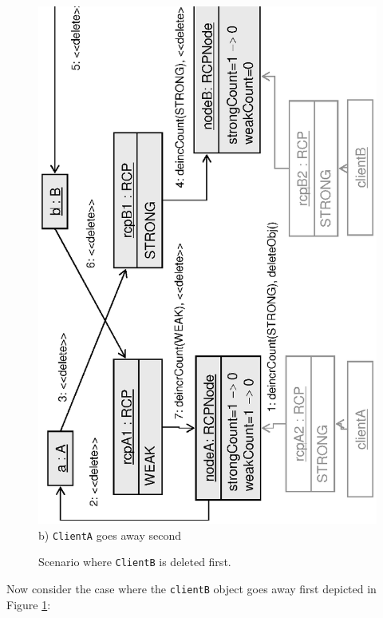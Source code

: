 \documentclass[pdf,ps2pdf,11pt]{SANDreport}
\begin{document}
{\begin{figure}
\begin{center}
\includegraphics*[angle=270,scale=0.65]{CircularRCP_A_B_ClientB_2}
\\[2ex] b) {}\texttt{ClientA} goes away second \\[3ex]
\end{center}
\caption{
\label{fig:CircularRCP_A_B_ClientB}
Scenario where {}\texttt{ClientB} is deleted first.  }
\end{figure}
\esinglespace}

Now consider the case where the {}\texttt{clientB} object goes away
first depicted in Figure {}\ref{fig:CircularRCP_A_B_ClientB}:
\end{document}
